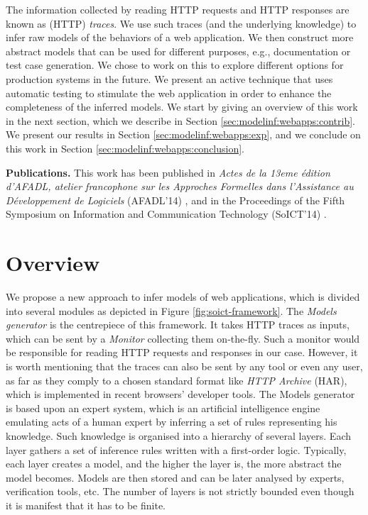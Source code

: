 The information collected by reading HTTP requests and HTTP
responses are known as (HTTP) \textit{traces}. We use such traces
(and the underlying knowledge) to infer raw models of the
behaviors of a web application. We then construct more abstract
models that can be used for different purposes, e.g.,
documentation or test case generation. We chose to work on this
to explore different options for production systems in the
future. We present an active technique that uses automatic
testing to stimulate the web application in order to enhance the
completeness of the inferred models.
We start by giving an overview of this work in the next section,
which we describe in Section \ref{sec:modelinf:webapps:contrib}.
We present our results in Section \ref{sec:modelinf:webapps:exp},
and we conclude on this work in Section
\ref{sec:modelinf:webapps:conclusion}.

\textbf{Publications.} This work has been published in
\textit{Actes de la 13eme {\'e}dition d’AFADL, atelier
francophone sur les Approches Formelles dans l’Assistance au
D{\'e}veloppement de Logiciels} (AFADL'14)
\cite{durand2014inference}, and in the Proceedings of the Fifth
Symposium on Information and Communication Technology (SoICT'14)
\cite{DBLP:conf/soict/DurandS14}.


\section{Overview}

We propose a new approach to infer models of web applications,
which is divided into several modules as depicted in Figure
\ref{fig:soict-framework}. The \textit{Models generator} is the
centrepiece of this framework. It takes HTTP traces as inputs,
which can be sent by a \textit{Monitor} collecting them on-the-fly.
Such a monitor would be responsible for reading HTTP requests and
responses in our case. However, it is worth mentioning that the
traces can also be sent by any tool or even any user, as far as
they comply to a chosen standard format like \textit{HTTP
Archive} (HAR), which is implemented in recent browsers'
developer tools. The Models generator is based upon an expert
system, which is an artificial intelligence engine emulating acts
of a human expert by inferring a set of rules representing his
knowledge.  Such knowledge is organised into a hierarchy of
several layers.  Each layer gathers a set of inference rules
written with a first-order logic. Typically, each layer creates a
model, and the higher the layer is, the more abstract the model
becomes. Models are then stored and can be later analysed by
experts, verification tools, etc. The number of layers is not
strictly bounded even though it is manifest that it has to be
finite.

